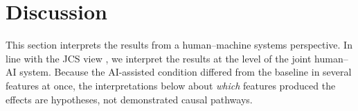 \documentclass[journal]{IEEEtran}
\theoremstyle{plain}
\theoremstyle{definition}
\providecommand{\DIFaddtex}[1]{{\protect\color{blue} \sf #1}} %
\providecommand{\DIFaddbegin}{} %
\providecommand{\DIFaddend}{} %
\providecommand{\DIFdelbegin}{} %
\providecommand{\DIFdelend}{} %
\providecommand{\DIFadd}[1]{\texorpdfstring{\DIFaddtex{#1}}{#1}} %
\newcommand{\DIFscaledelfig}{0.5}
\newlength{\DIFdelgraphicswidth} %
\newlength{\DIFdelgraphicsheight} %
\newcommand{\DIFaddincludegraphics}[2][]{{\color{blue}\fbox{\DIFOincludegraphics[#1]{#2}}}} %
\newcommand{\DIFdelincludegraphics}[2][]{%
\sbox{\DIFdelgraphicsbox}{\DIFOincludegraphics[#1]{#2}}%
\settoboxwidth{\DIFdelgraphicswidth}{\DIFdelgraphicsbox} %
\settoboxtotalheight{\DIFdelgraphicsheight}{\DIFdelgraphicsbox} %
\scalebox{\DIFscaledelfig}{%
\parbox[b]{\DIFdelgraphicswidth}{\usebox{\DIFdelgraphicsbox}\\[-\baselineskip] \rule{\DIFdelgraphicswidth}{0em}}\llap{\resizebox{\DIFdelgraphicswidth}{\DIFdelgraphicsheight}{%
\setlength{\unitlength}{\DIFdelgraphicswidth}%
\begin{picture}(1,1)%
\thicklines\linethickness{2pt} %
{\color[rgb]{1,0,0}\put(0,0){\framebox(1,1){}}}%
{\color[rgb]{1,0,0}\put(0,0){\line( 1,1){1}}}%
{\color[rgb]{1,0,0}\put(0,1){\line(1,-1){1}}}%
\end{picture}%
}\hspace*{3pt}}} %
} %
\DeclareRobustCommand{\DIFaddbegin}{\DIFOaddbegin \let\includegraphics\DIFaddincludegraphics} %
\DeclareRobustCommand{\DIFaddend}{\DIFOaddend \let\includegraphics\DIFOincludegraphics} %
\DeclareRobustCommand{\DIFdelbegin}{\DIFOdelbegin \let\includegraphics\DIFdelincludegraphics} %
\DeclareRobustCommand{\DIFdelend}{\DIFOaddend \let\includegraphics\DIFOincludegraphics} %
\begin{document}
    \DIFdelbegin %
\DIFdelend %
\DIFaddbegin \section{\DIFadd{Discussion}}
\label{sec:discussion}
\DIFadd{This section interprets the results from a human--machine systems perspective. In line with the JCS view \cite{Hollnagel2005JCS,Woods2006JCS}, we interpret the results at the level of the joint human--AI system. Because the AI-assisted condition differed from the baseline in several features at once, the interpretations below about \emph{which} features produced the effects are hypotheses, not demonstrated causal pathways.
}\DIFaddend 
\end{document}
